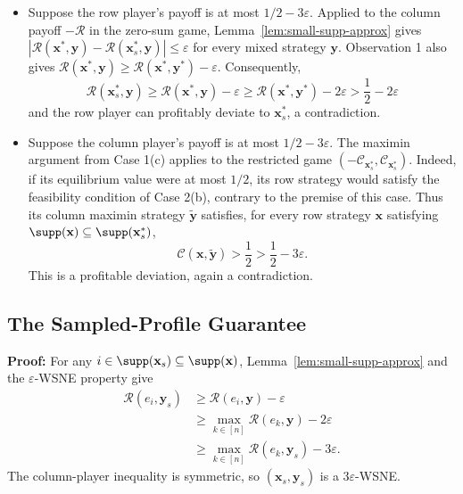 \begin{itemize}
  \item Suppose the row player's payoff is at most \(1/2-3\varepsilon\). Applied to the column payoff \(-\mathcal{R}\) in the zero-sum game, Lemma~\ref{lem:small-supp-approx} gives
        \(|\mathcal{R}(\mathbf{x}^*,\mathbf{y})-\mathcal{R}(\mathbf{x}_s^*,\mathbf{y})|\le\varepsilon\) for every mixed strategy \(\mathbf{y}\). Observation 1 also gives
        \(\mathcal{R}(\mathbf{x}^*,\mathbf{y})\ge\mathcal{R}(\mathbf{x}^*,\mathbf{y}^*)-\varepsilon\).
        Consequently,
        \[
          \mathcal{R}(\mathbf{x}_s^*, \mathbf{y}) \ge \mathcal{R}(\mathbf{x}^*, \mathbf{y}) - \varepsilon \ge \mathcal{R}(\mathbf{x}^*, \mathbf{y}^*) - 2\varepsilon > \frac{1}{2} - 2\varepsilon
        \]
        and the row player can profitably deviate to \(\mathbf{x}_s^*\), a contradiction.

  \item Suppose the column player's payoff is at most \(1/2-3\varepsilon\). The maximin argument from Case 1(c) applies to the restricted game \((-\mathcal{C}_{\mathbf{x}_s^*},\mathcal{C}_{\mathbf{x}_s^*})\). Indeed, if its equilibrium value were at most \(1/2\), its row strategy would satisfy the feasibility condition of Case 2(b), contrary to the premise of this case. Thus its column maximin strategy \(\tilde{\mathbf{y}}\) satisfies, for every row strategy \(\mathbf{x}\) satisfying \(\supp(\mathbf{x}) \subseteq \supp(\mathbf{x}_s^*)\),
        \[
          \mathcal{C}(\mathbf{x},\tilde{\mathbf{y}})>\frac12>\frac12-3\varepsilon.
        \]
        This is a profitable deviation, again a contradiction.
\end{itemize}

\subsection{The Sampled-Profile Guarantee}
\label{app:sampled-wsne-proof}

\textbf{Proof:} For any \(i \in \supp(\mathbf{x}_s) \subseteq \supp(\mathbf{x})\), Lemma~\ref{lem:small-supp-approx} and the \(\varepsilon\)-WSNE property give
\begin{align*}
  \mathcal{R}(e_i, \mathbf{y}_s)
   & \ge \mathcal{R}(e_i, \mathbf{y})-\varepsilon                  \\
   & \ge \max_{k\in[n]}\mathcal{R}(e_k,\mathbf{y})-2\varepsilon    \\
   & \ge \max_{k\in[n]}\mathcal{R}(e_k,\mathbf{y}_s)-3\varepsilon.
\end{align*}
The column-player inequality is symmetric, so \((\mathbf{x}_s,\mathbf{y}_s)\) is a \(3\varepsilon\)-WSNE.
